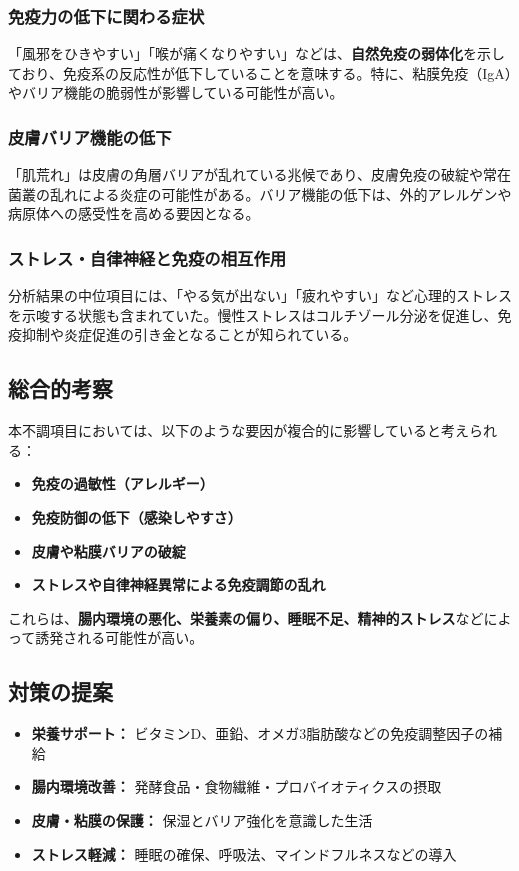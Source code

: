 \documentclass[a4paper,12pt]{article}
\begin{document}
\subsubsection*{免疫力の低下に関わる症状}
「風邪をひきやすい」「喉が痛くなりやすい」などは、\textbf{自然免疫の弱体化}を示しており、免疫系の反応性が低下していることを意味する。特に、粘膜免疫（IgA）やバリア機能の脆弱性が影響している可能性が高い。

\subsubsection*{皮膚バリア機能の低下}
「肌荒れ」は皮膚の角層バリアが乱れている兆候であり、皮膚免疫の破綻や常在菌叢の乱れによる炎症の可能性がある。バリア機能の低下は、外的アレルゲンや病原体への感受性を高める要因となる。

\subsubsection*{ストレス・自律神経と免疫の相互作用}
分析結果の中位項目には、「やる気が出ない」「疲れやすい」など心理的ストレスを示唆する状態も含まれていた。慢性ストレスはコルチゾール分泌を促進し、免疫抑制や炎症促進の引き金となることが知られている。

\subsection*{総合的考察}

本不調項目においては、以下のような要因が複合的に影響していると考えられる：

\begin{itemize}
    \item \textbf{免疫の過敏性（アレルギー）}
    \item \textbf{免疫防御の低下（感染しやすさ）}
    \item \textbf{皮膚や粘膜バリアの破綻}
    \item \textbf{ストレスや自律神経異常による免疫調節の乱れ}
\end{itemize}

これらは、\textbf{腸内環境の悪化、栄養素の偏り、睡眠不足、精神的ストレス}などによって誘発される可能性が高い。

\subsection*{対策の提案}

\begin{itemize}
    \item \textbf{栄養サポート：} ビタミンD、亜鉛、オメガ3脂肪酸などの免疫調整因子の補給
    \item \textbf{腸内環境改善：} 発酵食品・食物繊維・プロバイオティクスの摂取
    \item \textbf{皮膚・粘膜の保護：} 保湿とバリア強化を意識した生活
    \item \textbf{ストレス軽減：} 睡眠の確保、呼吸法、マインドフルネスなどの導入
\end{itemize}
\end{document}
